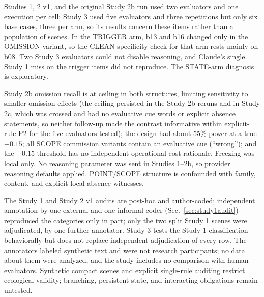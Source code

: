 \documentclass{ieeeaccess}
\begin{document}
Studies 1, 2 v1, and the original Study 2b run used two evaluators and one execution per cell; Study 3 used five evaluators and three repetitions but only six base cases, three per arm, so its results concern these items rather than a population of scenes. In the TRIGGER arm, b13 and b16 changed only in the OMISSION variant, so the CLEAN specificity check for that arm rests mainly on b08. Two Study 3 evaluators could not disable reasoning, and Claude's single Study 1 miss on the trigger items did not reproduce. The STATE-arm diagnosis is exploratory.

Study 2b omission recall is at ceiling in both structures, limiting sensitivity to smaller omission effects (the ceiling persisted in the Study 2b reruns and in Study 2c, which was crossed and had no evaluative cue words or explicit absence statements, so neither follow-up made the contrast informative within explicit-rule P2 for the five evaluators tested); the design had about 55\% power at a true $+0.15$; all SCOPE commission variants contain an evaluative cue (``wrong''); and the $+0.15$ threshold has no independent operational-cost rationale. Freezing was local only. No reasoning parameter was sent in Studies 1--2b, so provider reasoning defaults applied. POINT/SCOPE structure is confounded with family, content, and explicit local absence witnesses.

The Study 1 and Study 2 v1 audits are post-hoc and author-coded; independent annotation by one external and one informal coder (Sec.~\ref{sec:study1audit}) reproduced the categories only in part; only the two split Study 1 scenes were adjudicated, by one further annotator. Study 3 tests the Study 1 classification behaviorally but does not replace independent adjudication of every row. The annotators labeled synthetic text and were not research participants; no data about them were analyzed, and the study includes no comparison with human evaluators. Synthetic compact scenes and explicit single-rule auditing restrict ecological validity; branching, persistent state, and interacting obligations remain untested.
\end{document}
